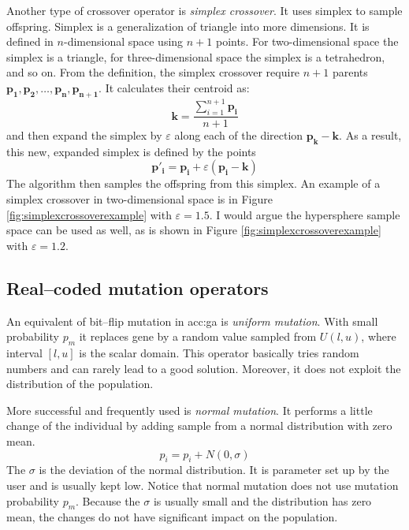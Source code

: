 Another type of crossover operator is \emph{simplex crossover}. It uses simplex to sample offspring. Simplex is a generalization of triangle into more dimensions. It is defined in $n$-dimensional space using $n+1$ points. For two-dimensional space the simplex is a triangle, for three-dimensional space the simplex is a tetrahedron, and so on. From the definition, the simplex crossover require $n+1$ parents $\mathbf{p_1}, \mathbf{p_2}, \dots, \mathbf{p_n}, \mathbf{p_{n+1}}$. It calculates their centroid as:
$$
\mathbf{k}=\frac{\sum_{i=1}^{n+1} \mathbf{p_i}}{n+1}
$$
and then expand the simplex by $\varepsilon$ along each of the direction $\mathbf{p_k} - \mathbf{k}$. As a result, this new, expanded simplex is defined by the points
$$
\mathbf{p'_i} = \mathbf{p_i} + \varepsilon\left( \mathbf{p_i} - \mathbf{k} \right)
$$
The algorithm then samples the offspring from this simplex. An example of a simplex crossover in two-dimensional space is in Figure \ref{fig:simplexcrossoverexample} with $\varepsilon=1.5$.
I would argue the hypersphere sample space can be used as well, as is shown in Figure \ref{fig:simplexcrossoverexample} with $\varepsilon=1.2$.

\subsection{Real--coded mutation operators}

An equivalent of bit--flip mutation in \acrshort{acc:ga} is \emph{uniform mutation}. With small probability $p_m$ it replaces gene by a random value sampled from $U(l,u)$, where interval $\left[l,u\right]$ is the scalar domain. This operator basically tries random numbers and can rarely lead to a good solution. Moreover, it does not exploit the distribution of the population.

More successful and frequently used is \emph{normal mutation}. It performs a little change of the individual by adding sample from a normal distribution with zero mean.
$$
p_i = p_i + N(0,\sigma)
$$
The $\sigma$ is the deviation of the normal distribution. It is parameter set up by the user and is usually kept low. Notice that normal mutation does not use mutation probability $p_m$. Because the $\sigma$ is usually small and the distribution has zero mean, the changes do not have significant impact on the population.

